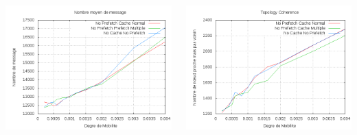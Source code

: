 \documentclass{beamer}
\begin{document}
  \begin{frame}
	\begin{columns}
         \begin{column}{5cm}
          \includegraphics[scale=0.25]{./Ressources/Images/Courbes_Final_Rapport/Nombre_Messages_Caches.png}\\
         \end{column}
         \begin{column}{5cm}
          \includegraphics[scale=0.25]{./Ressources/Images/Courbes_Final_Rapport/Topology_Coherence_Caches.png}\\
         \end{column}
        \end{columns}


  \end{frame}
\end{document}
